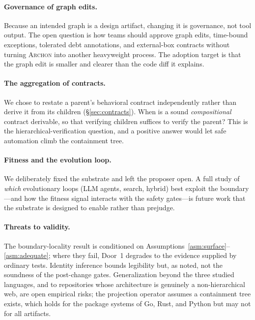 \documentclass[sigconf,review,anonymous]{acmart}
\theoremstyle{plain}
\theoremstyle{definition}
\begin{document}
\paragraph{Governance of graph edits.}
Because an intended graph is a design artifact, changing it is governance, not
tool output. The open question is how teams should approve graph edits,
time-bound exceptions, tolerated debt annotations, and external-box contracts
without turning \textsc{Archon} into another heavyweight process. The adoption target is
that the graph edit is smaller and clearer than the code diff it explains.

\paragraph{The aggregation of contracts.}
We chose to restate a parent's behavioral contract independently rather than
derive it from its children (\S\ref{sec:contracts}). When is a sound
\emph{compositional} contract derivable, so that verifying children suffices to
verify the parent? This is the hierarchical-verification question, and a
positive answer would let safe automation climb the containment tree.

\paragraph{Fitness and the evolution loop.}
We deliberately fixed the substrate and left the proposer open. A full study of
\emph{which} evolutionary loops (LLM agents, search, hybrid) best exploit the
boundary---and how the fitness signal interacts with the safety gates---is
future work that the substrate is designed to enable rather than prejudge.

\paragraph{Threats to validity.}
The boundary-locality result is conditioned on
Assumptions~\ref{asm:surface}--\ref{asm:adequate}; where they fail, Door~1
degrades to the evidence supplied by ordinary tests. Identity inference bounds
legibility but, as noted, not the soundness of the post-change gates.
Generalization beyond the three studied languages, and to repositories whose
architecture is genuinely a non-hierarchical web, are open empirical risks; the
projection operator assumes a containment tree exists, which holds for the
package systems of Go, Rust, and Python but may not for all artifacts.
\end{document}
